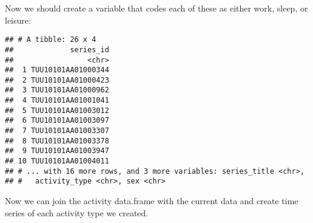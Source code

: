 \documentclass[]{book}
\newenvironment{Shaded}{\begin{snugshade}}{\end{snugshade}}
\newcommand{\KeywordTok}[1]{\textcolor[rgb]{0.13,0.29,0.53}{\textbf{{#1}}}}
\newcommand{\DataTypeTok}[1]{\textcolor[rgb]{0.13,0.29,0.53}{{#1}}}
\newcommand{\StringTok}[1]{\textcolor[rgb]{0.31,0.60,0.02}{{#1}}}
\newcommand{\OtherTok}[1]{\textcolor[rgb]{0.56,0.35,0.01}{{#1}}}
\newcommand{\NormalTok}[1]{{#1}}
\theoremstyle{definition}
\theoremstyle{definition}
\theoremstyle{remark}
\begin{document}
Now we should create a variable that codes each of these as either work,
sleep, or leisure:

\begin{Shaded}
\end{Shaded}

\begin{verbatim}
## # A tibble: 26 x 4
##             series_id
##                 <chr>
##  1 TUU10101AA01000344
##  2 TUU10101AA01000423
##  3 TUU10101AA01000962
##  4 TUU10101AA01001041
##  5 TUU10101AA01003012
##  6 TUU10101AA01003097
##  7 TUU10101AA01003307
##  8 TUU10101AA01003378
##  9 TUU10101AA01003947
## 10 TUU10101AA01004011
## # ... with 16 more rows, and 3 more variables: series_title <chr>,
## #   activity_type <chr>, sex <chr>
\end{verbatim}

Now we can join the activity data.frame with the current data and create
time series of each activity type we created.

\begin{Shaded}
\end{Shaded}
\end{document}
